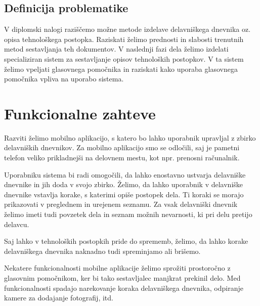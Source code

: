 \documentclass[a4paper, 12pt]{book}
\begin{document}



\subsection{Definicija problematike}

V diplomski nalogi raziščemo možne metode izdelave delavniškega dnevnika oz. opisa tehnološkega postopka.
Raziskati želimo prednosti in slabosti trenutnih metod sestavljanja teh dokumentov.
V naslednji fazi dela želimo izdelati specializiran sistem za sestavljanje opisov tehnoloških postopkov.
V ta sistem želimo vpeljati glasovnega pomočnika in raziskati kako uporaba glasovnega pomočnika vpliva na uporabo sistema.



\section{Funkcionalne zahteve}

Razviti želimo mobilno aplikacijo, s katero bo lahko uporabnik upravljal z zbirko delavniških dnevnikov.
Za mobilno aplikacijo smo se odločili, saj je pametni telefon veliko prikladnejši na delovnem mestu, kot npr. prenosni računalnik.

Uporabniku sistema bi radi omogočili, da lahko enostavno ustvarja delavniške dnevnike in jih doda v svojo zbirko.
Želimo, da lahko uporabnik v delavniške dnevnike vstavlja korake, s katerimi opiše postopek dela.
Ti koraki se morajo prikazovati v preglednem in urejenem seznamu.
Za vsak delavniški dnevnik želimo imeti tudi povzetek dela in seznam možnih nevarnosti, ki pri delu pretijo delavcu.

Saj lahko v tehnoloških postopkih pride do sprememb, želimo, da lahko korake delavniškega dnevnika naknadno tudi spreminjamo ali brišemo.

Nekatere funkcionalnosti mobilne aplikacije želimo sprožiti prostoročno z glasovnim pomočnikom, ker bi tako sestavljalec manjkrat prekinil delo.
Med funkcionalnosti spadajo narekovanje koraka delavniškega dnevnika, odpiranje kamere za dodajanje fotografij, itd.
\end{document}
